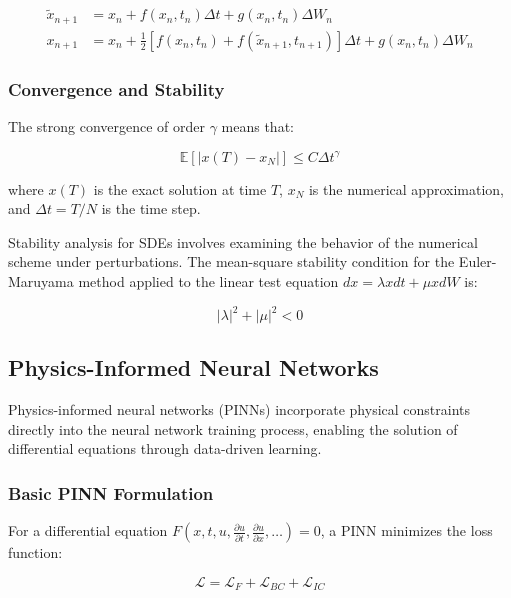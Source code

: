 \begin{align}
\tilde{x}_{n+1} &= x_n + f(x_n, t_n) \Delta t + g(x_n, t_n) \Delta W_n \\
x_{n+1} &= x_n + \frac{1}{2}[f(x_n, t_n) + f(\tilde{x}_{n+1}, t_{n+1})] \Delta t + g(x_n, t_n) \Delta W_n
\end{align}

\subsubsection{Convergence and Stability}

The strong convergence of order $\gamma$ means that:

\begin{equation}
\mathbb{E}[|x(T) - x_N|] \leq C \Delta t^{\gamma}
\end{equation}

where $x(T)$ is the exact solution at time $T$, $x_N$ is the numerical approximation, and $\Delta t = T/N$ is the time step.

Stability analysis for SDEs involves examining the behavior of the numerical scheme under perturbations. The mean-square stability condition for the Euler-Maruyama method applied to the linear test equation $dx = \lambda x dt + \mu x dW$ is:

\begin{equation}
|\lambda|^2 + |\mu|^2 < 0
\end{equation}

\subsection{Physics-Informed Neural Networks}

Physics-informed neural networks (PINNs) incorporate physical constraints directly into the neural network training process, enabling the solution of differential equations through data-driven learning.

\subsubsection{Basic PINN Formulation}

For a differential equation $F(x, t, u, \frac{\partial u}{\partial t}, \frac{\partial u}{\partial x}, \ldots) = 0$, a PINN minimizes the loss function:

\begin{equation}
\mathcal{L} = \mathcal{L}_F + \mathcal{L}_{BC} + \mathcal{L}_{IC}
\end{equation}

